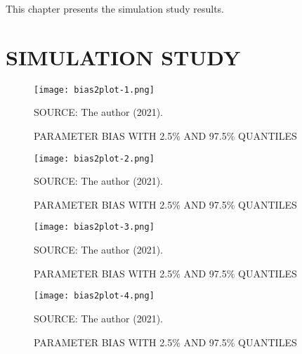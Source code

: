 This chapter presents the simulation study results.

\section{SIMULATION STUDY}
\label{cap:simures}

\newpage
\begin{figure}[H]
 \setlength{\abovecaptionskip}{.0001pt}
 \caption{PARAMETER BIAS WITH 2.5\% AND 97.5\% QUANTILES}
 \vspace{0.2cm}\centering
 \texttt{[image: bias2plot-1.png]}\\
 \begin{footnotesize}
  SOURCE: The author (2021).
 \end{footnotesize}
 \label{fig:biasbeta1}
\end{figure}

\begin{figure}[H]
 \setlength{\abovecaptionskip}{.0001pt}
 \caption{PARAMETER BIAS WITH 2.5\% AND 97.5\% QUANTILES}
 \vspace{0.2cm}\centering
 \texttt{[image: bias2plot-2.png]}\\
 \begin{footnotesize}
  SOURCE: The author (2021).
 \end{footnotesize}
 \label{fig:biasbeta2}
\end{figure}

\begin{figure}[H]
 \setlength{\abovecaptionskip}{.0001pt}
 \caption{PARAMETER BIAS WITH 2.5\% AND 97.5\% QUANTILES}
 \vspace{0.2cm}\centering
 \texttt{[image: bias2plot-3.png]}\\
 \begin{footnotesize}
  SOURCE: The author (2021).
 \end{footnotesize}
 \label{fig:biasgama1}
\end{figure}

\begin{figure}[H]
 \setlength{\abovecaptionskip}{.0001pt}
 \caption{PARAMETER BIAS WITH 2.5\% AND 97.5\% QUANTILES}
 \vspace{0.2cm}\centering
 \texttt{[image: bias2plot-4.png]}\\
 \begin{footnotesize}
  SOURCE: The author (2021).
 \end{footnotesize}
 \label{fig:biasgama2}
\end{figure}


